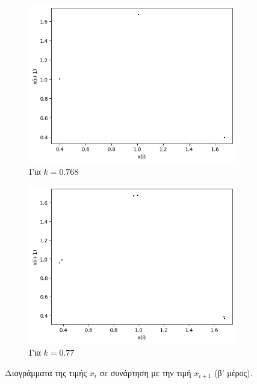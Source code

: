 \begin{figure}[ht]
\begin{subfigure}[b]{0.4\textwidth}
		\includegraphics[width=\textwidth]{LateX images/graphs q14/g23}
		\caption{Για $k=0.768$}
		\label{f:k83}
	\end{subfigure}
	\hfill
	\begin{subfigure}[b]{0.4\textwidth}
		\centering
		\includegraphics[width=\textwidth]{LateX images/graphs q14/g24}
		\caption{Για $k=0.77$}
		\label{f:k80}
	\end{subfigure}
	\hfill
	\caption{Διαγράμματα της τιμής \(x_i\) σε συνάρτηση με την τιμή \(x_{i+1}\) (β' μέρος).}
\end{figure}

